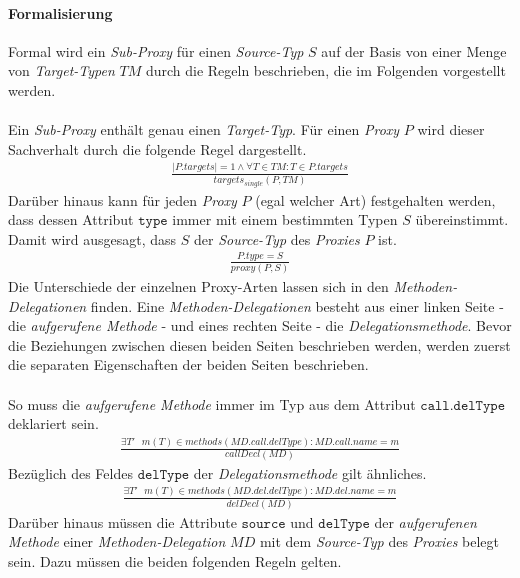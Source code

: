 \paragraph{Formalisierung}
Formal wird ein \emph{Sub-Proxy} für einen \emph{Source-Typ} $S$ auf der Basis von einer Menge von \emph{Target-Typen} $\mathit{TM}$ durch die Regeln beschrieben, die im Folgenden vorgestellt werden.
\\\\
Ein \emph{Sub-Proxy} enthält genau einen \emph{Target-Typ}. Für einen \emph{Proxy} $P$ wird dieser Sachverhalt durch die folgende Regel dargestellt.
\begin{gather*}
\frac{|\mathit{P.targets}| = 1 \wedge \forall \mathit{T} \in \mathit{TM}: T \in \mathit{P.targets}}{\mathit{targets_{single}(P,\mathit{TM})}}
\end{gather*}
\noindent
Darüber hinaus kann für jeden \emph{Proxy} $P$ (egal welcher Art) festgehalten werden, dass dessen Attribut $\texttt{type}$ immer mit einem bestimmten Typen $S$ übereinstimmt. Damit wird ausgesagt, dass $S$ der \emph{Source-Typ} des \emph{Proxies} $P$ ist.
\begin{gather*}
\frac{\mathit{P.type} = \mathit{S}}{\mathit{proxy(P,S)}}
\end{gather*}
\noindent
Die Unterschiede der einzelnen Proxy-Arten lassen sich in den \emph{Methoden-Delegationen} finden. Eine \emph{Methoden-Delegationen} besteht aus einer linken Seite - die \emph{aufgerufene Methode} - und eines rechten Seite - die \emph{Delegationsmethode}. Bevor die Beziehungen zwischen diesen beiden Seiten beschrieben werden, werden zuerst die separaten Eigenschaften der beiden Seiten beschrieben.
\\\\
So muss die \emph{aufgerufene Methode} immer im Typ aus dem Attribut $\texttt{call.delType}$ deklariert sein.
\begin{gather*}
\frac{\exists \mathit{T'\text{ } m(T)} \in \mathit{methods(MD.call.delType)}: \mathit{MD.call.name} = m}
{\mathit{callDecl(MD)}}
\end{gather*}
\noindent
Bezüglich des Feldes $\texttt{delType}$ der \emph{Delegationsmethode} gilt ähnliches.
\begin{gather*}
\frac{\exists \mathit{T'\text{ }m(T)} \in \mathit{methods(MD.del.delType)}: \mathit{MD.del.name} = m}
{\mathit{delDecl(MD)}}
\end{gather*}
\noindent
Darüber hinaus müssen die Attribute $\texttt{source}$ und $\texttt{delType}$ der \emph{aufgerufenen Methode} einer \emph{Methoden-Delegation} $\mathit{MD}$ mit dem \emph{Source-Typ} des \emph{Proxies} belegt sein. Dazu müssen die beiden folgenden Regeln gelten.
